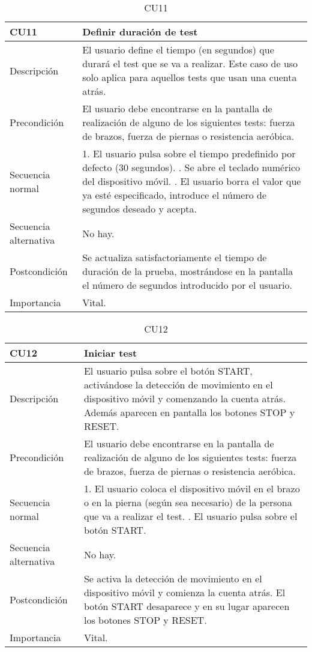 \begin{table}[H]
\label{CU11}
\begin{center}
\begin{tabular}{| l | p{10cm} |}
\hline
CU11 & Definir duración de test\\
\hline
Descripción & El usuario define el tiempo (en segundos) que durará el test que se va a realizar. Este caso de uso solo aplica para aquellos tests que usan una cuenta atrás.\\
\hline
Precondición & El usuario debe encontrarse en la pantalla de realización de alguno de los siguientes tests: fuerza de brazos, fuerza de piernas o resistencia aeróbica.\\
\hline
Secuencia normal & 1. El usuario pulsa sobre el tiempo predefinido por defecto (30 segundos).
\newline 2. Se abre el teclado numérico del dispositivo móvil.
\newline 3. El usuario borra el valor que ya esté especificado, introduce el número de segundos deseado y acepta.\\
\hline
Secuencia alternativa & No hay.\\
\hline
Postcondición & Se actualiza satisfactoriamente el tiempo de duración de la prueba, mostrándose en la pantalla el número de segundos introducido por el usuario.\\
\hline
Importancia & Vital.\\
\hline
\end{tabular}
\end{center}
\caption{CU11}
\end{table}

\begin{table}[H]
\label{CU12}
\begin{center}
\begin{tabular}{| l | p{10cm} |}
\hline
CU12 & Iniciar test\\
\hline
Descripción & El usuario pulsa sobre el botón START, activándose la detección de movimiento en el dispositivo móvil y comenzando la cuenta atrás. Además aparecen en pantalla los botones STOP y RESET.\\
\hline
Precondición & El usuario debe encontrarse en la pantalla de realización de alguno de los siguientes tests: fuerza de brazos, fuerza de piernas o resistencia aeróbica.\\
\hline
Secuencia normal & 1. El usuario coloca el dispositivo móvil en el brazo o en la pierna (según sea necesario) de la persona que va a realizar el test.
\newline 2. El usuario pulsa sobre el botón START.\\
\hline
Secuencia alternativa & No hay.\\
\hline
Postcondición & Se activa la detección de movimiento en el dispositivo móvil y comienza la cuenta atrás. El botón START desaparece y en su lugar aparecen los botones STOP y RESET.\\
\hline
Importancia & Vital.\\
\hline
\end{tabular}
\end{center}
\caption{CU12}
\end{table}

